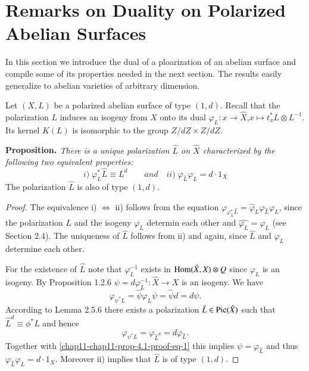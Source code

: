 \section{Remarks on Duality on Polarized Abelian Surfaces} \label{chap11-sec-4}
\pageoriginale

In this section we introduce the dual of a ploarization of an abelian surface and compile some of its properties needed in the next section. The results easily generalize to abelian varieties of arbitrary dimension.

Let $(X, L)$ be a polarized abelian surface of type $(1,d)$. Recall that the polarization $L$ induces an isogeny from $X$ onto its dual $\varphi_{L}: x\rightarrow \widehat{X}$,$ x \mapsto t_{x}^{*}L \otimes L^{-1}$. Its kernel $K(L)$ is isomorphic to the group $Z/dZ \times Z/dZ$.

\medskip
\noindent
{\bfseries {} Proposition. \label{chap11-prop-4.1}} \textit{There is a unique polarization $\hat{L}$ on $\hat{X}$ characterized by the following two equivalent properties:}
$$
i)\; \varphi_{L}^{*}\hat{L} \equiv L^{d} \qquad  and \quad ii)\; \varphi_{\hat{L}}\varphi_{L}=d \cdot 1_{X}
$$ 
The polarization $\hat{L}$ is also of type $(1,d)$.

\begin{proof}
The equivalence i) $\Longleftrightarrow $ ii) follows from the equation
 $\varphi_{\varphi_{L}^{*} \hat{L}} = \hat{\varphi}_{L}\varphi_{\hat{L}}\varphi_{L}$, since the polarization $L$ and the isogeny $\varphi_{L}$ determin each other and $\hat{\varphi_{L}} = \varphi_{L}$ (see \cite{chap11-keyL-B} Section 2.4). The uniqueness of $\hat{L}$ follows from ii) and again, since $\hat{L}$ and $ \varphi_{\hat{L}}$ determine each other.
 
For the existence of $\hat{L}$ note that $\varphi_{L}^{-1}$ exists in $\operatorname{Hom}(\hat{X}, X) \otimes Q$ since $\varphi_{L}$ is an isogeny. By \cite{chap11-keyL-B} Proposition 1.2.6 $\psi =d\varphi_{L}^{-1} : \hat{X} \rightarrow X$ is an isogeny. We have
\begin{equation*}\label{chap11-chap11-prop-4.1-proof-eq-1}
\varphi_{\psi^{*}L} = \hat{\psi}\varphi_{L}\psi = \hat{\psi}d = d\psi.\tag{1}
\end{equation*}
According to \cite{chap11-keyL-B} Lemma 2.5.6 there exists a polarization $\hat{L} \in \operatorname{Pic}(\hat{X})$ such that
$\hat{L}^{d} \equiv \phi^{*}L$ and hence
$$
\varphi_{\psi^{*}L}=\varphi_{\hat{L}^{d}} =d\varphi_{\hat{L}}.
$$
Together with \eqref{chap11-chap11-prop-4.1-proof-eq-1} this implies $\psi = \varphi_{\hat{L}}$ and thus $\varphi_{\hat{L}}\varphi_{L} =d \cdot 1_{X}$. Moreover ii) implies that $\hat{L}$ is of type $(1,d)$.
\end{proof}

